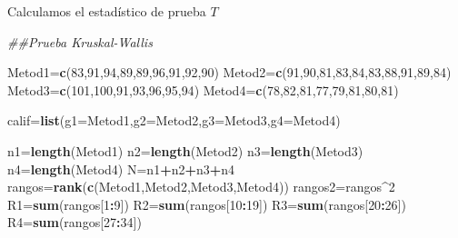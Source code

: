\documentclass[
  a4paper,
  oneside,
  openany]{book}
\newenvironment{Shaded}{\begin{snugshade}}{\end{snugshade}}
\newcommand{\CommentTok}[1]{\textcolor[rgb]{0.56,0.35,0.01}{\textit{#1}}}
\newcommand{\DataTypeTok}[1]{\textcolor[rgb]{0.13,0.29,0.53}{#1}}
\newcommand{\DecValTok}[1]{\textcolor[rgb]{0.00,0.00,0.81}{#1}}
\newcommand{\KeywordTok}[1]{\textcolor[rgb]{0.13,0.29,0.53}{\textbf{#1}}}
\newcommand{\NormalTok}[1]{#1}
\newcommand{\OperatorTok}[1]{\textcolor[rgb]{0.81,0.36,0.00}{\textbf{#1}}}
\begin{document}
Calculamos el estadístico de prueba \(T\)

\begin{Shaded}
\begin{Highlighting}[]
\CommentTok{\#\#Prueba Kruskal{-}Wallis}

\NormalTok{Metod1=}\KeywordTok{c}\NormalTok{(}\DecValTok{83}\NormalTok{,}\DecValTok{91}\NormalTok{,}\DecValTok{94}\NormalTok{,}\DecValTok{89}\NormalTok{,}\DecValTok{89}\NormalTok{,}\DecValTok{96}\NormalTok{,}\DecValTok{91}\NormalTok{,}\DecValTok{92}\NormalTok{,}\DecValTok{90}\NormalTok{)    }
\NormalTok{Metod2=}\KeywordTok{c}\NormalTok{(}\DecValTok{91}\NormalTok{,}\DecValTok{90}\NormalTok{,}\DecValTok{81}\NormalTok{,}\DecValTok{83}\NormalTok{,}\DecValTok{84}\NormalTok{,}\DecValTok{83}\NormalTok{,}\DecValTok{88}\NormalTok{,}\DecValTok{91}\NormalTok{,}\DecValTok{89}\NormalTok{,}\DecValTok{84}\NormalTok{)}
\NormalTok{Metod3=}\KeywordTok{c}\NormalTok{(}\DecValTok{101}\NormalTok{,}\DecValTok{100}\NormalTok{,}\DecValTok{91}\NormalTok{,}\DecValTok{93}\NormalTok{,}\DecValTok{96}\NormalTok{,}\DecValTok{95}\NormalTok{,}\DecValTok{94}\NormalTok{)        }
\NormalTok{Metod4=}\KeywordTok{c}\NormalTok{(}\DecValTok{78}\NormalTok{,}\DecValTok{82}\NormalTok{,}\DecValTok{81}\NormalTok{,}\DecValTok{77}\NormalTok{,}\DecValTok{79}\NormalTok{,}\DecValTok{81}\NormalTok{,}\DecValTok{80}\NormalTok{,}\DecValTok{81}\NormalTok{)}

\NormalTok{calif=}\KeywordTok{list}\NormalTok{(}\DataTypeTok{g1=}\NormalTok{Metod1,}\DataTypeTok{g2=}\NormalTok{Metod2,}\DataTypeTok{g3=}\NormalTok{Metod3,}\DataTypeTok{g4=}\NormalTok{Metod4)}

\NormalTok{n1=}\KeywordTok{length}\NormalTok{(Metod1)}
\NormalTok{n2=}\KeywordTok{length}\NormalTok{(Metod2)}
\NormalTok{n3=}\KeywordTok{length}\NormalTok{(Metod3)}
\NormalTok{n4=}\KeywordTok{length}\NormalTok{(Metod4)}
\NormalTok{N=n1}\OperatorTok{+}\NormalTok{n2}\OperatorTok{+}\NormalTok{n3}\OperatorTok{+}\NormalTok{n4}
\NormalTok{rangos=}\KeywordTok{rank}\NormalTok{(}\KeywordTok{c}\NormalTok{(Metod1,Metod2,Metod3,Metod4))}
\NormalTok{rangos2=rangos}\OperatorTok{\^{}}\DecValTok{2}
\NormalTok{R1=}\KeywordTok{sum}\NormalTok{(rangos[}\DecValTok{1}\OperatorTok{:}\DecValTok{9}\NormalTok{])}
\NormalTok{R2=}\KeywordTok{sum}\NormalTok{(rangos[}\DecValTok{10}\OperatorTok{:}\DecValTok{19}\NormalTok{])}
\NormalTok{R3=}\KeywordTok{sum}\NormalTok{(rangos[}\DecValTok{20}\OperatorTok{:}\DecValTok{26}\NormalTok{])}
\NormalTok{R4=}\KeywordTok{sum}\NormalTok{(rangos[}\DecValTok{27}\OperatorTok{:}\DecValTok{34}\NormalTok{])}


\end{Highlighting}
\end{Shaded}
\end{document}
